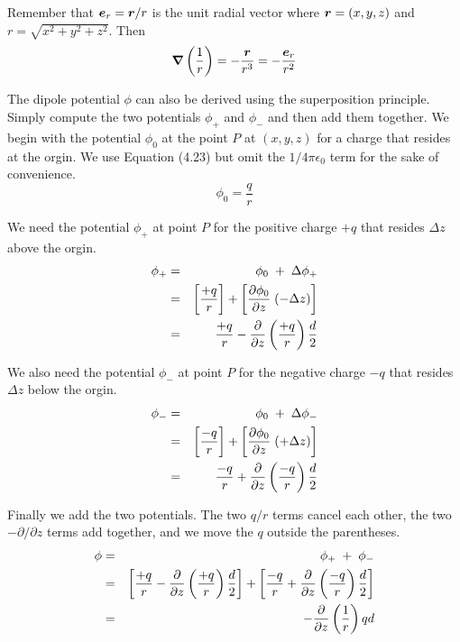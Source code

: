Remember that $\boldsymbol{e}_r=\boldsymbol{r}/r$ is the unit radial vector
where $\boldsymbol{r}=(x,y,z)$ and $r=\sqrt{x^2+y^2+z^2}$. Then
\begin{equation*}
  \boldsymbol{\nabla} \left( \frac{1}{r} \right) = - \frac{\boldsymbol{r}}{r^3}
  = - \frac{\boldsymbol{e}_r}{r^2}
\end{equation*}

The dipole potential $\phi$ can also be derived using the superposition principle.
Simply compute the two potentials $\phi_+$ and $\phi_-$ and then add them together.
We begin with the potential $\phi_0$ at the point $P$ at $(x,y,z)$ 
for a charge that resides at the orgin.
We use Equation (4.23) but omit the $1/4\pi\epsilon_0$ term for the sake of convenience.
\begin{equation*}
  \phi_0 = \frac{q}{r}
\end{equation*}

We need the potential $\phi_+$ at point $P$ for the positive charge $+q$
that resides $\Delta z$ above the orgin.
\begin{eqnarray}
  \phi_+ &=& \phi_0 \; + \; \Delta \phi_{+} \nonumber\\
  &=& \left[\frac{+q}{r}\right] + \left[\frac{\partial \phi_0}{\partial z}\;(-\Delta z)\right] \nonumber\\
  &=& \frac{+q}{r} - \frac{\partial }{\partial z}\left(\frac{+q}{r}\right) \frac{d}{2}
\end{eqnarray}

We also need the potential $\phi_-$ at point $P$ for the negative charge $-q$
that resides $\Delta z$ below the orgin.
\begin{eqnarray}
  \phi_- &=& \phi_0 \; + \; \Delta \phi_{-} \nonumber\\
  &=& \left[\frac{-q}{r}\right] + \left[\frac{\partial \phi_0}{\partial z}\;(+\Delta z)\right] \nonumber\\
  &=& \frac{-q}{r} + \frac{\partial }{\partial z}\left(\frac{-q}{r}\right) \frac{d}{2}
\end{eqnarray}

Finally we add the two potentials.
The two $q/r$ terms cancel each other, the two $-\partial/\partial z$ terms add together,
and we move the $q$ outside the parentheses.
\begin{eqnarray}
  \phi &=& \phi_{+} \; + \; \phi_{-} \nonumber\\
  &=& \left[ \frac{+q}{r} - \frac{\partial }{\partial z}\left(\frac{+q}{r}\right) \frac{d}{2} \right]
    + \left[ \frac{-q}{r} + \frac{\partial }{\partial z}\left(\frac{-q}{r}\right) \frac{d}{2} \right] \nonumber\\
  &=& - \frac{\partial }{\partial z} \left(\frac{1}{r}\right) qd
\end{eqnarray}

